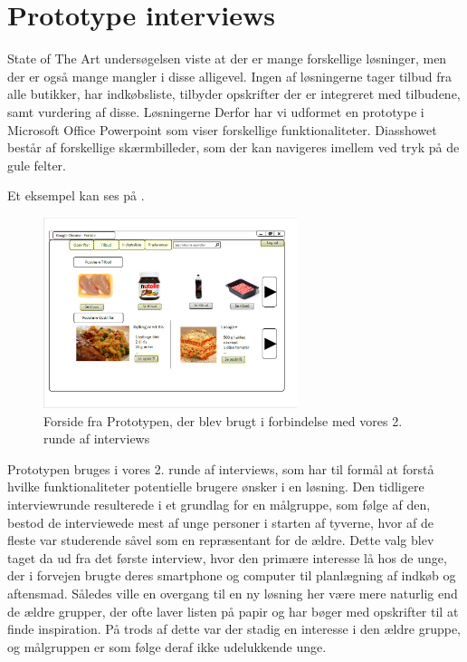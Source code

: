\section{Prototype interviews}\label{section:interview2}
State of The Art undersøgelsen viste at der er mange forskellige løsninger, men der er også mange mangler i disse alligevel.
Ingen af løsningerne tager tilbud fra alle butikker, har indkøbsliste, tilbyder opskrifter der er integreret med tilbudene, samt vurdering af disse.
Løsningerne
Derfor har vi udformet en prototype i Microsoft Office Powerpoint som viser forskellige funktionaliteter.
Diasshowet består af forskellige skærmbilleder, som der kan navigeres imellem ved tryk på de gule felter.

Et eksempel kan ses på .

\begin{figure}
\vspace{-20pt}
	\begin{center}
		\includegraphics[width=0.66\textwidth]{images/Images/prototype-forside.PNG}
	\end{center}
	\vspace{-20pt}
	\caption{Forside fra Prototypen, der blev brugt i forbindelse med vores 2. runde af interviews}\label{ss:Prototype}
	\vspace{-20pt}
\end{figure}

Prototypen bruges i vores 2. runde af interviews, som har til formål at forstå hvilke funktionaliteter potentielle brugere ønsker i en løsning.
Den tidligere interviewrunde resulterede i et grundlag for en målgruppe, som følge af den, bestod de interviewede mest af unge personer i starten af tyverne, hvor af de fleste var studerende såvel som en repræsentant for de ældre.
Dette valg blev taget da ud fra det første interview, hvor den primære interesse lå hos de unge, der i forvejen brugte deres smartphone og computer til planlægning af indkøb og aftensmad.
Således ville en overgang til en ny løsning her være mere naturlig end de ældre grupper, der ofte laver listen på papir og har bøger med opskrifter til at finde inspiration.
På trods af dette var der stadig en interesse i den ældre gruppe, og målgruppen er som følge deraf ikke udelukkende unge.

